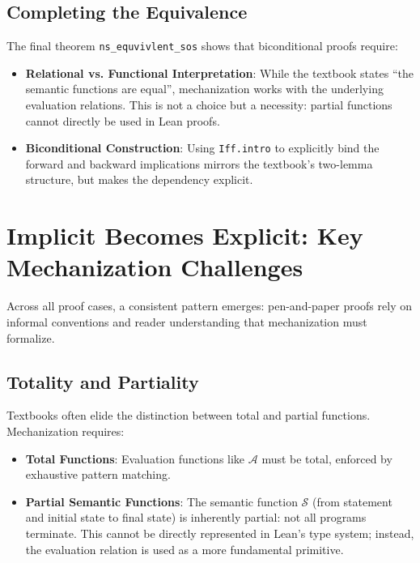 \subsection*{Completing the Equivalence}

The final theorem \texttt{ns\_equvivlent\_sos} shows that biconditional
proofs require:

\begin{itemize}
    \item \textbf{Relational vs. Functional Interpretation}:
    While the textbook states ``the semantic functions are equal'',
    mechanization works with the underlying evaluation relations.
    This is not a choice but a necessity: partial functions cannot
    directly be used in Lean proofs.
    
    \item \textbf{Biconditional Construction}:
    Using \texttt{Iff.intro} to explicitly bind the forward and backward
    implications mirrors the textbook's two-lemma structure, but makes
    the dependency explicit.
\end{itemize}

%
%
%
\section{Implicit Becomes Explicit: Key Mechanization Challenges}
\label{discussion:sec:implicit_explicit}

Across all proof cases, a consistent pattern emerges: pen-and-paper
proofs rely on informal conventions and reader understanding that
mechanization must formalize.

\subsection*{Totality and Partiality}

Textbooks often elide the distinction between total and partial functions.
Mechanization requires:

\begin{itemize}
    \item \textbf{Total Functions}:
    Evaluation functions like \(\mathcal{A}\) must be total,
    enforced by exhaustive pattern matching.
    
    \item \textbf{Partial Semantic Functions}:
    The semantic function \(\mathcal{S}\)
    (from statement and initial state to final state)
    is inherently partial: not all programs terminate.
    This cannot be directly represented in Lean's type system; instead,
    the evaluation relation is used as a more fundamental primitive.
\end{itemize}

